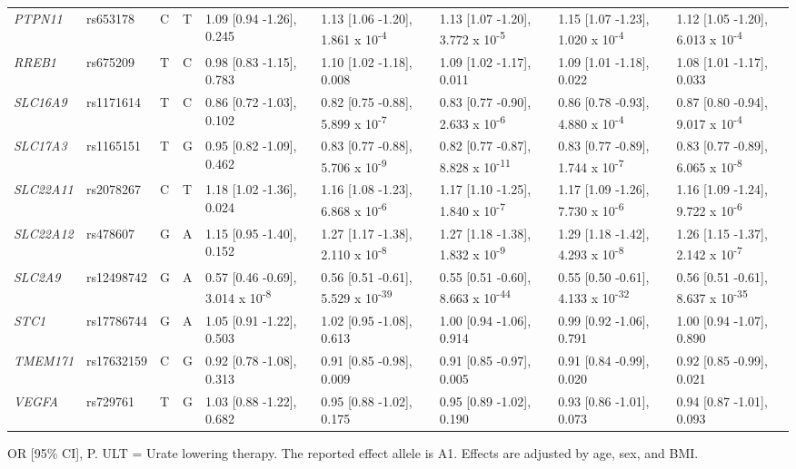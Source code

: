 \documentclass[twoside,openright]{report}
\begin{document}
\begin{landscape}
\begin{table}[!h]
{\begin{threeparttable}
\begin{tabular}[t]{lllllllll}
\em{PTPN11} & rs653178 & C & T & 1.09 [0.94 -1.26], 0.245 & 1.13 [1.06 -1.20], 1.861 x 10\textsuperscript{-4} & 1.13 [1.07 -1.20], 3.772 x 10\textsuperscript{-5} & 1.15 [1.07 -1.23], 1.020 x 10\textsuperscript{-4} & 1.12 [1.05 -1.20], 6.013 x 10\textsuperscript{-4}\\
\em{RREB1} & rs675209 & T & C & 0.98 [0.83 -1.15], 0.783 & 1.10 [1.02 -1.18], 0.008 & 1.09 [1.02 -1.17], 0.011 & 1.09 [1.01 -1.18], 0.022 & 1.08 [1.01 -1.17], 0.033\\
\em{SLC16A9} & rs1171614 & T & C & 0.86 [0.72 -1.03], 0.102 & 0.82 [0.75 -0.88], 5.899 x 10\textsuperscript{-7} & 0.83 [0.77 -0.90], 2.633 x 10\textsuperscript{-6} & 0.86 [0.78 -0.93], 4.880 x 10\textsuperscript{-4} & 0.87 [0.80 -0.94], 9.017 x 10\textsuperscript{-4}\\
\em{SLC17A3} & rs1165151 & T & G & 0.95 [0.82 -1.09], 0.462 & 0.83 [0.77 -0.88], 5.706 x 10\textsuperscript{-9} & 0.82 [0.77 -0.87], 8.828 x 10\textsuperscript{-11} & 0.83 [0.77 -0.89], 1.744 x 10\textsuperscript{-7} & 0.83 [0.77 -0.89], 6.065 x 10\textsuperscript{-8}\\
\em{SLC22A11} & rs2078267 & C & T & 1.18 [1.02 -1.36], 0.024 & 1.16 [1.08 -1.23], 6.868 x 10\textsuperscript{-6} & 1.17 [1.10 -1.25], 1.840 x 10\textsuperscript{-7} & 1.17 [1.09 -1.26], 7.730 x 10\textsuperscript{-6} & 1.16 [1.09 -1.24], 9.722 x 10\textsuperscript{-6}\\
\em{SLC22A12} & rs478607 & G & A & 1.15 [0.95 -1.40], 0.152 & 1.27 [1.17 -1.38], 2.110 x 10\textsuperscript{-8} & 1.27 [1.18 -1.38], 1.832 x 10\textsuperscript{-9} & 1.29 [1.18 -1.42], 4.293 x 10\textsuperscript{-8} & 1.26 [1.15 -1.37], 2.142 x 10\textsuperscript{-7}\\
\em{SLC2A9} & rs12498742 & G & A & 0.57 [0.46 -0.69], 3.014 x 10\textsuperscript{-8} & 0.56 [0.51 -0.61], 5.529 x 10\textsuperscript{-39} & 0.55 [0.51 -0.60], 8.663 x 10\textsuperscript{-44} & 0.55 [0.50 -0.61], 4.133 x 10\textsuperscript{-32} & 0.56 [0.51 -0.61], 8.637 x 10\textsuperscript{-35}\\
\em{STC1} & rs17786744 & G & A & 1.05 [0.91 -1.22], 0.503 & 1.02 [0.95 -1.08], 0.613 & 1.00 [0.94 -1.06], 0.914 & 0.99 [0.92 -1.06], 0.791 & 1.00 [0.94 -1.07], 0.890\\
\em{TMEM171} & rs17632159 & C & G & 0.92 [0.78 -1.08], 0.313 & 0.91 [0.85 -0.98], 0.009 & 0.91 [0.85 -0.97], 0.005 & 0.91 [0.84 -0.99], 0.020 & 0.92 [0.85 -0.99], 0.021\\
\em{VEGFA} & rs729761 & T & G & 1.03 [0.88 -1.22], 0.682 & 0.95 [0.88 -1.02], 0.175 & 0.95 [0.89 -1.02], 0.190 & 0.93 [0.86 -1.01], 0.073 & 0.94 [0.87 -1.01], 0.093\\
\bottomrule
\end{tabular}
\begin{tablenotes}
\item OR [95\% CI], P. ULT = Urate lowering therapy. The reported effect allele is A1. Effects are adjusted by age, sex, and BMI.
\end{tablenotes}
\end{threeparttable}}
\end{table}
\end{landscape}
\end{document}
